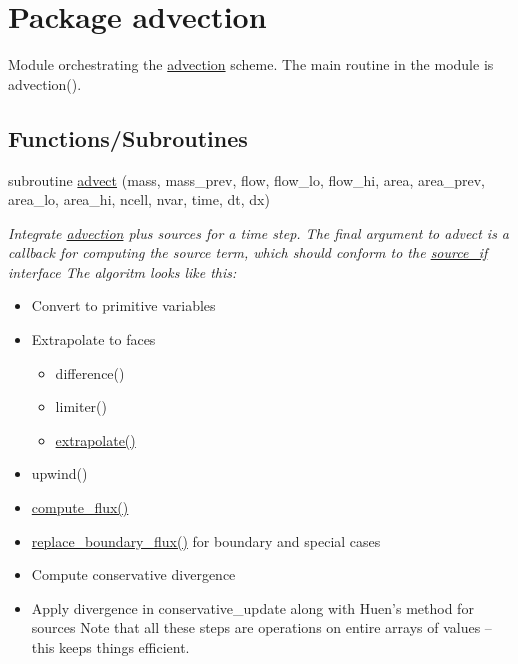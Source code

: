 \hypertarget{a00026}{
\section{Package advection}
\label{a00026}
}
Module orchestrating the \hyperlink{a00026}{advection} scheme. The main routine in the module is advection().  


\subsection*{Functions/Subroutines}
\begin{CompactItemize}
\item 
subroutine \hyperlink{a00026_4dbccca3daf30ad5f7c82915361a78f7}{advect} (mass, mass\_\-prev, flow, flow\_\-lo, flow\_\-hi, area, area\_\-prev, area\_\-lo, area\_\-hi, ncell, nvar, time, dt, dx)
\begin{CompactList}\small\item\em Integrate \hyperlink{a00026}{advection} plus sources for a time step. The final argument to advect is a callback for computing the source term, which should conform to the \hyperlink{a00036}{source\_\-if} interface The algoritm looks like this:\begin{itemize}
\item Convert to primitive variables\item Extrapolate to faces\begin{itemize}
\item difference()\item limiter()\item \hyperlink{a00026_36ba824cb5dc6ca6127866376d2e79ec}{extrapolate()}\end{itemize}
\item upwind()\item \hyperlink{a00026_3947a8a29b1c666b2d1b7223215e9873}{compute\_\-flux()}\item \hyperlink{a00026_ce0b27ec0ac171c15a919d07fb3b32c3}{replace\_\-boundary\_\-flux()} for boundary and special cases\item Compute conservative divergence\item Apply divergence in conservative\_\-update along with Huen's method for sources Note that all these steps are operations on entire arrays of values -- this keeps things efficient. \end{itemize}
\item\end{CompactList}\item 

\end{CompactItemize}
